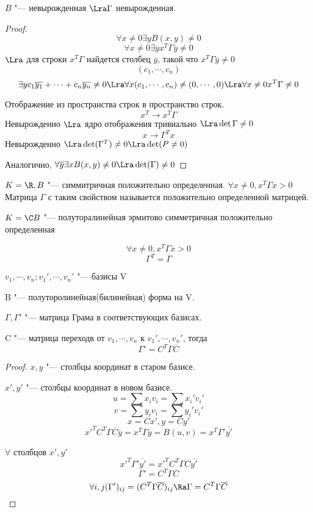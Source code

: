 \begin{lemma}{}
$B$ "--- невырожденная $\Lra \Gamma$ невырожденная. 
\end{lemma}
\begin{proof}
$$\forall x \ne 0 \exists y B(x, y) \ne 0$$
$$\forall x \ne 0 \exists \overline{y} x^{T}\Gamma\overline{y} \ne 0$$
$ \Lra$ для строки $x^{T}\Gamma$ найдется столбец $\overline{y}$, такой что
$x^{T}\Gamma\overline{y} \ne 0$
$$(c_1, \cdots, c_n)$$
$$\exists y c_1\overline{y_1} + \cdots + c_n\overline{y_n} \ne 0 \Lra \forall x (c_1, \cdots, c_n) \ne (0, \cdots, 0) \Lra \forall x \ne 0 x^T\Gamma \ne 0$$

Отображение из пространства строк в пространство строк.
$$x^{T} \to x^T \Gamma$$
Невырожденно $\Lra$ ядро отображения тривиально $\Lra \det \Gamma \ne 0$
$$x \to \Gamma^{T} x $$
Невырожденно $\Lra \det(\Gamma^T) \ne 0 \Lra \det(P \ne 0)$

Аналогично, $\forall \overline{y} \exists x B(x, y) \ne 0 \Lra \det(\Gamma) \ne 0$
\end{proof}
\begin{Def}
$K = \R, B$ "--- симмитричная положительно определенная.
$\forall x \ne 0, x^{T}\Gamma x > 0$
Матрица $\Gamma$ с таким свойством называется положительно определенной матрицей.
\end{Def} 
\begin{Def}
$K = \C B$ "--- полуторалинейная эрмитово симметричная положительно определенная

$$\forall x \ne 0, x^T \Gamma \overline{x} > 0$$
$$\Gamma^T = \overline{\Gamma}$$
\end{Def}

\begin{lemma}{}
$v_1, \cdots, v_n; v_1', \cdots, v_n'$ "--- базисы V

B "--- полуторолинейная(билинейная) форма на V.

$\Gamma, \Gamma'$ "--- матрица Грама в соответствующих базисах. 

C "--- матрица переходв от $v_1, \cdots, v_n$ к  $v_1', \cdots, v_n'$,
тогда
$$\Gamma' = C^{T}\Gamma \overline{C}$$
\end{lemma}

\begin{proof}
$x, y$ "--- столбцы координат в старом базисе. 

$x', y'$ "--- столбцы координат в новом базисе.
$$u = \sum x_i v_i = \sum x_i' v_i'$$
$$v = \sum y_i v_i = \sum y_i' v_i'$$
$$x = C x', y = Cy'$$
$$x'^{T}C^T\Gamma\overline{C}\overline{y} = x^T\Gamma \overline{y} = B(u, v) = x^{T}\Gamma'\overline{y'} $$

$\forall$ столбцов $x', y'$
$$x'^T \Gamma'\overline{y'} = x'^TC^T \Gamma \overline{C}\overline{y'}$$
$$\Gamma' = C^T\Gamma\overline{C}$$
$$\forall i, j (\Gamma')_{ij} = (C^{T}\Gamma \overline{C})_{ij} \Ra \Gamma = C^{T}\Gamma\overline{C}$$
\end{proof}